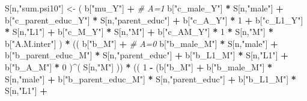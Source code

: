 \documentclass[
]{book}
\newenvironment{Shaded}{\begin{snugshade}}{\end{snugshade}}
\newcommand{\CommentTok}[1]{\textcolor[rgb]{0.56,0.35,0.01}{\textit{#1}}}
\newcommand{\DecValTok}[1]{\textcolor[rgb]{0.00,0.00,0.81}{#1}}
\newcommand{\NormalTok}[1]{#1}
\newcommand{\OtherTok}[1]{\textcolor[rgb]{0.56,0.35,0.01}{#1}}
\newcommand{\SpecialCharTok}[1]{\textcolor[rgb]{0.81,0.36,0.00}{\textbf{#1}}}
\newcommand{\StringTok}[1]{\textcolor[rgb]{0.31,0.60,0.02}{#1}}
\begin{document}
\begin{Shaded}
\begin{Highlighting}[]
\NormalTok{    S[n,}\StringTok{"sum.psi10"}\NormalTok{] }\OtherTok{\textless{}{-}}\NormalTok{  ( b[}\StringTok{"mu\_Y"}\NormalTok{] }\SpecialCharTok{+}                                          \CommentTok{\# A=1}
\NormalTok{                             b[}\StringTok{"c\_male\_Y"}\NormalTok{] }\SpecialCharTok{*}\NormalTok{ S[n,}\StringTok{"male"}\NormalTok{] }\SpecialCharTok{+} 
\NormalTok{                             b[}\StringTok{"c\_parent\_educ\_Y"}\NormalTok{] }\SpecialCharTok{*}\NormalTok{ S[n,}\StringTok{"parent\_educ"}\NormalTok{] }\SpecialCharTok{+} 
\NormalTok{                             b[}\StringTok{"c\_A\_Y"}\NormalTok{] }\SpecialCharTok{*} \DecValTok{1} \SpecialCharTok{+} 
\NormalTok{                             b[}\StringTok{"c\_L1\_Y"}\NormalTok{] }\SpecialCharTok{*}\NormalTok{ S[n,}\StringTok{"L1"}\NormalTok{] }\SpecialCharTok{+}
\NormalTok{                             b[}\StringTok{"c\_M\_Y"}\NormalTok{] }\SpecialCharTok{*}\NormalTok{ S[n,}\StringTok{"M"}\NormalTok{] }\SpecialCharTok{+}
\NormalTok{                             b[}\StringTok{"c\_AM\_Y"}\NormalTok{] }\SpecialCharTok{*} \DecValTok{1} \SpecialCharTok{*}\NormalTok{ S[n,}\StringTok{"M"}\NormalTok{] }\SpecialCharTok{*}\NormalTok{ b[}\StringTok{"A.M.inter"}\NormalTok{] ) }\SpecialCharTok{*}
\NormalTok{      (( b[}\StringTok{"b\_M"}\NormalTok{] }\SpecialCharTok{+}                                                             \CommentTok{\# A\textquotesingle{}=0}
\NormalTok{           b[}\StringTok{"b\_male\_M"}\NormalTok{] }\SpecialCharTok{*}\NormalTok{ S[n,}\StringTok{"male"}\NormalTok{] }\SpecialCharTok{+} 
\NormalTok{           b[}\StringTok{"b\_parent\_educ\_M"}\NormalTok{] }\SpecialCharTok{*}\NormalTok{ S[n,}\StringTok{"parent\_educ"}\NormalTok{] }\SpecialCharTok{+} 
\NormalTok{           b[}\StringTok{"b\_L1\_M"}\NormalTok{] }\SpecialCharTok{*}\NormalTok{ S[n,}\StringTok{"L1"}\NormalTok{] }\SpecialCharTok{+}
\NormalTok{           b[}\StringTok{"b\_A\_M"}\NormalTok{] }\SpecialCharTok{*} \DecValTok{0}\NormalTok{ )}\SpecialCharTok{\^{}}\NormalTok{( S[n,}\StringTok{"M"}\NormalTok{] )) }\SpecialCharTok{*}
\NormalTok{      (( }\DecValTok{1} \SpecialCharTok{{-}}\NormalTok{ (b[}\StringTok{"b\_M"}\NormalTok{] }\SpecialCharTok{+} 
\NormalTok{                b[}\StringTok{"b\_male\_M"}\NormalTok{] }\SpecialCharTok{*}\NormalTok{ S[n,}\StringTok{"male"}\NormalTok{] }\SpecialCharTok{+} 
\NormalTok{                b[}\StringTok{"b\_parent\_educ\_M"}\NormalTok{] }\SpecialCharTok{*}\NormalTok{ S[n,}\StringTok{"parent\_educ"}\NormalTok{] }\SpecialCharTok{+} 
\NormalTok{                b[}\StringTok{"b\_L1\_M"}\NormalTok{] }\SpecialCharTok{*}\NormalTok{ S[n,}\StringTok{"L1"}\NormalTok{] }\SpecialCharTok{+}

\end{Highlighting}
\end{Shaded}
\end{document}
